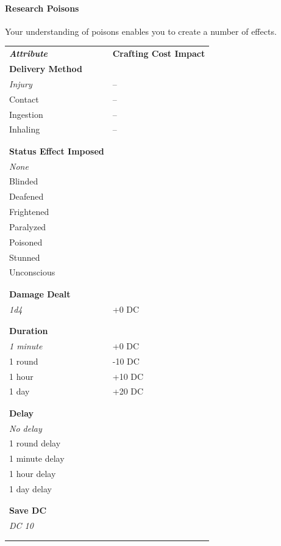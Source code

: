 \paragraph*{Research Poisons}
Your understanding of poisons enables you to create a number of effects.

\begin{tabular}{ll}
{\it \bf Attribute} & {\bf Crafting Cost Impact} \\
{\bf Delivery Method} &\\
{\it Injury} & -- \\
Contact      & -- \\
Ingestion    & -- \\
Inhaling     & -- \\
&\\
&\\
{\bf Status Effect Imposed }&\\
{\it None}  &\\
Blinded     &\\
Deafened    &\\
Frightened  &\\
Paralyzed   &\\
Poisoned    &\\
Stunned     &\\
Unconscious &\\
&\\
&\\
{\bf Damage Dealt }&\\
{\it 1d4}  & +0 DC  \\
&\\
&\\
{\bf Duration }&\\
{\it 1 minute}  & +0 DC  \\
1 round   & -10 DC \\
1 hour    & +10 DC \\
1 day     & +20 DC \\
&\\
&\\
{\bf Delay }&\\
{\it No delay} &\\
1 round delay  &\\
1 minute delay &\\
1 hour delay   &\\
1 day delay    &\\
&\\
&\\
{\bf Save DC } &\\
{\it DC 10} &\\
&\\
&\\
\end{tabular}

